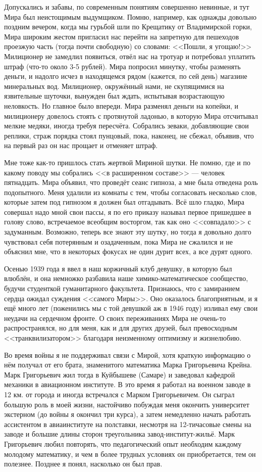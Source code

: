 Допускались и забавы, по современным понятиям совершенно невинные,
и тут Мира был неистощимым выдумщиком.
Помню, например, как однажды довольно поздним вечером, когда мы гурьбой шли по Крещатику от Владимирской горки,
Мира широким жестом пригласил нас перейти на запретную для пешеходов проезжую часть
(тогда почти свободную) со словами: <<Пошли, я угощаю!>>
Милиционер не замедлил появиться, отвёл нас на тротуар и потребовал уплатить штраф (что-то около 3-5 рублей).
Мира попросил минутку, чтобы разменять деньги, и надолго исчез в находящемся рядом (кажется, по сей день)
магазине минеральных вод. Милиционер, окружённый нами, не скупящимися на язвительные шуточки,
вынужден был ждать, испытывая возрастающую неловкость.
Но главное было впереди. Мира разменял деньги на копейки, и милиционеру довелось стоять с протянутой ладонью, в которую Мира отсчитывал мелкие медяки, иногда требуя пересчёта. Собрались зеваки, добавляющие свои реплики, страж порядка стоял пунцовый, пока, наконец, не сбежал, объявив, что на первый раз он нас прощает и отменяет штраф.

Мне тоже как-то пришлось стать жертвой Мириной шутки.
Не помню, где и по какому поводу мы собрались <<в расширенном составе>> --- человек пятнадцать.
Мира объявил, что проведёт сеанс гипноза, а мне была отведена роль подопытного.
Меня удалили из комнаты с тем, чтобы согласовать несколько слов, которые затем под гипнозом я должен был отгадывать.
Всё шло гладко, Мира совершал надо мной свои пассы, я по его приказу называл первое пришедшее в голову слово,
встречаемое всеобщим восторгом, так как оно <<совпадало>> с задуманным.
Возможно, теперь все знают эту шутку, но тогда я довольно долго чувствовал себя потерянным и озадаченным,
пока Мира не сжалился и не объяснил мне, что в некоторых фокусах не один дурит всех, а все дурят одного.

Осенью 1939 года я ввел в наш коржичный клуб девушку, в которую был влюблён, и она немножко разбавила наше химико-математическое сообщество, будучи студенткой гуманитарного факультета. Признаюсь, что с замиранием сердца ожидал суждения <<самого Миры>>. Оно оказалось благоприятным, и я ещё много лет (поженились мы с той девушкой аж в 1946 году) изливал ему свои неудачи на сердечном фронте. О своих переживаниях Мира не очень-то распространялся, но для меня, как и для других друзей, был превосходным <<транквилизатором>> благодаря неизменному оптимизму и жизнелюбию.

Во время войны я не поддерживал связи с Мирой, хотя краткую информацию о нём получал от его брата, знаменитого математика Марка Григорьевича Крейна. Марк Григорьевич жил тогда в Куйбышеве (Самаре) и заведовал кафедрой механики в авиационном институте. В это время я работал на военном заводе в 12 км. от города и иногда встречался с Марком Григорьевичем. Он сыграл большую роль в моей жизни, настойчиво побуждая меня окончить университет экстерном (до войны я окончил три курса), а затем немедленно начать работать ассистентом в авиаинституте на полставки, несмотря на 12-тичасовые смены на заводе и большие длины сторон треугольника завод-институт-жильё. Марк Григорьевич любил повторять, что педагогический опыт необходим каждому молодому математику, и чем в более трудных условиях он приобретается, тем он полезнее. Позднее я понял, насколько он был прав.


